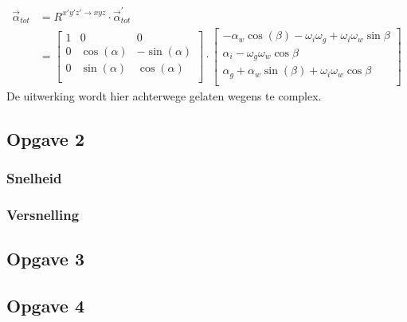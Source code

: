 \begin{equation}
\begin{split}
\vec{\alpha}_{tot}&=R^{x'y'z' \rightarrow xyz} \cdot \vec{\alpha}_{tot}^{'}\\
&=\begin{bmatrix}
1			&			0			&			0		   \\
0			&\cos(\alpha)&-\sin(\alpha)\\
0			&\sin(\alpha)&\cos(\alpha) \\
\end{bmatrix}
\cdot
\begin{bmatrix}
-\alpha_{w}\cos(\beta)-\omega_{i}\omega_{g}+\omega_{i}\omega_{w}\sin{\beta}\\
\alpha_{i}-\omega_{g}\omega_{w}\cos{\beta}\\
\alpha_{g}+	\alpha_{w} \sin(\beta)+\omega_{i}\omega_{w}\cos{\beta}\\
\end{bmatrix}
\end{split}
\label{eq:kin2.6}
\end{equation}
De uitwerking wordt hier achterwege gelaten wegens te complex.
\newpage
\subsection{Opgave 2}
\subsubsection{Snelheid}
\subsubsection{Versnelling}
\subsection{Opgave 3}
\subsection{Opgave 4}